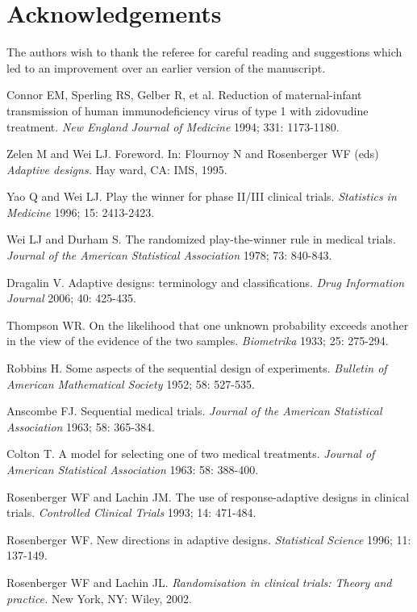 \section*{Acknowledgements}
The authors wish to thank the referee for careful reading and suggestions which led to an improvement over an earlier version of the manuscript.

\begin{thebibliography}

 Connor EM, Sperling RS, Gelber R, et al. Reduction of maternal-infant transmission of human immunodeficiency virus of type 1 with zidovudine treatment. \textit{New England Journal of Medicine} 1994; 331: 1173-1180.

 Zelen M and Wei LJ. Foreword. In: Flournoy N and Rosenberger WF (eds) \textit{Adaptive designs.}  Hay ward, CA: IMS, 1995.

 Yao Q and Wei LJ. Play the winner for phase II/III
clinical trials. \textit{Statistics in Medicine} 1996; 15: 2413-2423.

 Wei LJ and Durham S. The randomized play-the-winner rule in medical trials. \textit{Journal of the American Statistical Association} 1978; 73: 840-843.

 Dragalin V. Adaptive designs: terminology and classifications. \textit{Drug Information Journal} 2006; 40: 425-435.

 Thompson WR. On the likelihood that one unknown probability exceeds another in the view of the evidence of the two samples. \textit{Biometrika} 1933; 25: 275-294.

 Robbins H. Some aspects of the sequential design of experiments. \textit{Bulletin of American Mathematical Society} 1952; 58: 527-535.

 Anscombe FJ. Sequential medical trials. \textit{Journal of the American Statistical Association} 1963; 58: 365-384.

 Colton T. A model for selecting one of two medical
treatments. \textit{Journal of American Statistical Association} 1963: 58: 388-400.

 Rosenberger WF and Lachin JM. The use of response-adaptive designs in clinical trials. \textit{Controlled Clinical Trials} 1993; 14: 471-484.

 Rosenberger WF. New directions in adaptive designs. \textit{Statistical Science} 1996; 11: 137-149.

  Rosenberger WF and Lachin JL.  \textit{Randomisation in clinical trials: Theory and practice.} New York, NY: Wiley, 2002.


\end{thebibliography}

